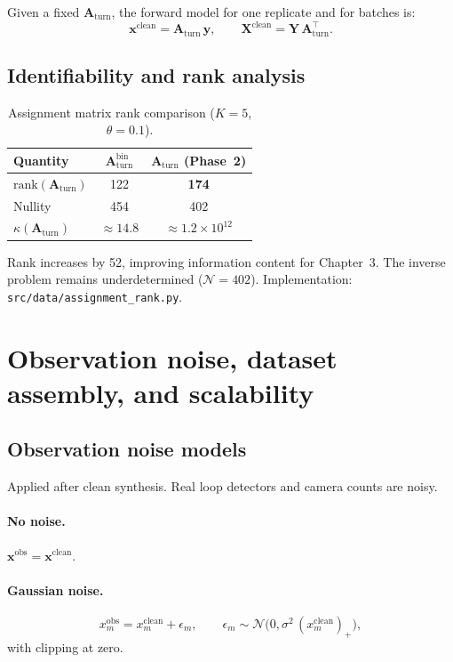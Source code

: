 \documentclass[11pt,a4paper]{report}
\newcommand{\mathbfy}{\mathbf{y}}
\newcommand{\mathbfx}{\mathbf{x}}
\newcommand{\mathbfX}{\mathbf{X}}
\newcommand{\mathbfY}{\mathbf{Y}}
\newcommand{\Aturn}{\mathbf{A}_{\mathrm{turn}}}
\begin{document}
Given a fixed $\Aturn$, the forward model for one replicate and for batches is:
\begin{equation}
    \mathbfx^{\mathrm{clean}} = \Aturn\,\mathbfy,
    \qquad
    \mathbfX^{\mathrm{clean}} = \mathbfY\,\Aturn^\top.
    \label{eq:forward_batch}
\end{equation}

\subsection{Identifiability and rank analysis}

\begin{table}[ht]
\centering
\caption{Assignment matrix rank comparison ($K=5$, $\theta=0.1$).}
\label{tab:rank_compare}
\begin{tabular}{@{}lcc@{}}
\toprule
\textbf{Quantity} & $\Aturn^{\mathrm{bin}}$ & $\Aturn$ (Phase~2) \\
\midrule
$\mathrm{rank}(\Aturn)$ & 122 & \textbf{174} \\
Nullity & 454 & 402 \\
$\kappa(\Aturn)$ & $\approx 14.8$ & $\approx 1.2\times 10^{12}$ \\
\bottomrule
\end{tabular}
\end{table}

Rank increases by 52, improving information content for Chapter~3. The inverse problem remains underdetermined ($\mathcal{N}=402$). Implementation: \texttt{src/data/assignment\_rank.py}.


\section{Observation noise, dataset assembly, and scalability}
\label{sec:ch2-dataset}

\subsection{Observation noise models}

Applied after clean synthesis. Real loop detectors and camera counts are noisy.

\paragraph{No noise.} $\mathbfx^{\mathrm{obs}} = \mathbfx^{\mathrm{clean}}$.

\paragraph{Gaussian noise.}
\begin{equation}
    x^{\mathrm{obs}}_m = x^{\mathrm{clean}}_m + \epsilon_m,
    \qquad \epsilon_m \sim \mathcal{N}\bigl(0,\sigma^2\,(x^{\mathrm{clean}}_m)_+\bigr),
    \label{eq:gauss_noise}
\end{equation}
with clipping at zero.
\end{document}

